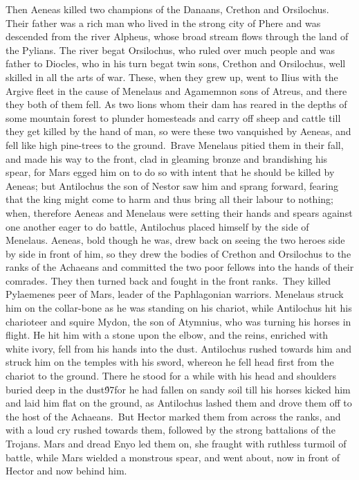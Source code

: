 {Then Aeneas killed two champions of the Danaans, Crethon and Orsilochus. Their father was a rich man who lived in the strong city of Phere and was descended from the river Alpheus, whose broad stream flows through the land of the Pylians. The river begat Orsilochus, who ruled over much people and was father to Diocles, who in his turn begat twin sons, Crethon and Orsilochus, well skilled in all the arts of war. These, when they grew up, went to Ilius with the Argive fleet in the cause of Menelaus and Agamemnon sons of Atreus, and there they both of them fell. As two lions whom their dam has reared in the depths of some mountain forest to plunder homesteads and carry off sheep and cattle till they get killed by the hand of man, so were these two vanquished by Aeneas, and fell like high pine-trees to the ground.\
Brave Menelaus pitied them in their fall, and made his way to the front, clad in gleaming bronze and brandishing his spear, for Mars egged him on to do so with intent that he should be killed by Aeneas; but Antilochus the son of Nestor saw him and sprang forward, fearing that the king might come to harm and thus bring all their labour to nothing; when, therefore Aeneas and Menelaus were setting their hands and spears against one another eager to do battle, Antilochus placed himself by the side of Menelaus. Aeneas, bold though he was, drew back on seeing the two heroes side by side in front of him, so they drew the bodies of Crethon and Orsilochus to the ranks of the Achaeans and committed the two poor fellows into the hands of their comrades. They then turned back and fought in the front ranks.\
They killed Pylaemenes peer of Mars, leader of the Paphlagonian warriors. Menelaus struck him on the collar-bone as he was standing on his chariot, while Antilochus hit his charioteer and squire Mydon, the son of Atymnius, who was turning his horses in flight. He hit him with a stone upon the elbow, and the reins, enriched with white ivory, fell from his hands into the dust. Antilochus rushed towards him and struck him on the temples with his sword, whereon he fell head first from the chariot to the ground. There he stood for a while with his head and shoulders buried deep in the dust\'97for he had fallen on sandy soil till his horses kicked him and laid him flat on the ground, as Antilochus lashed them and drove them off to the host of the Achaeans.\
But Hector marked them from across the ranks, and with a loud cry rushed towards them, followed by the strong battalions of the Trojans. Mars and dread Enyo led them on, she fraught with ruthless turmoil of battle, while Mars wielded a monstrous spear, and went about, now in front of Hector and now behind him.\
}
